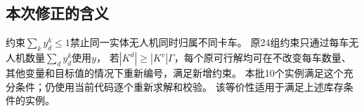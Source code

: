 \documentclass[UTF8]{ctexart}
\begin{document}
\subsection*{本次修正的含义}
约束$\sum_k y_d^k\le1$禁止同一实体无人机同时归属不同卡车。
原24组约束只通过每车无人机数量$\sum_d y_d^k$使用$y$，
若$|K^d|\ge |K^v|\Gamma$，每个原可行解均可在不改变每车数量、
其他变量和目标值的情况下重新编号，满足新增约束。
本批10个实例满足这个充分条件；仍使用当前代码逐个重新求解和校验。
该等价性适用于满足上述库存条件的实例。
\end{document}
